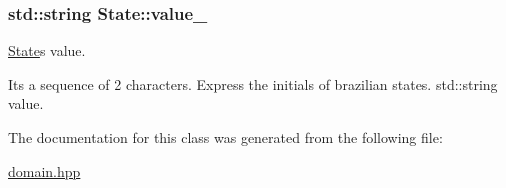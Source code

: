 \subsubsection[{\texorpdfstring{value\+\_\+}{value_}}]{\setlength{\rightskip}{0pt plus 5cm}std\+::string State\+::value\+\_\+\hspace{0.3cm}{\ttfamily [private]}}\hypertarget{classState_a6ba19e67857b864a5166471c32701c12}{}\label{classState_a6ba19e67857b864a5166471c32701c12}


\hyperlink{classState}{State}\textquotesingle{}s value. 

It\textquotesingle{}s a sequence of 2 characters. Express the initials of brazilian states. std\+::string value. 

The documentation for this class was generated from the following file\+:\begin{DoxyCompactItemize}
\item 
\hyperlink{domain_8hpp}{domain.\+hpp}\end{DoxyCompactItemize}
